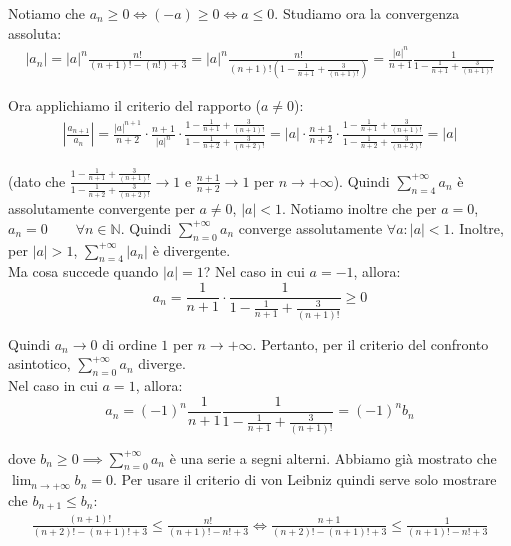\documentclass{article}
\begin{document}
\noindent Notiamo che $a_n \geq 0 \iff (-a) \geq 0 \iff a \leq 0$. Studiamo ora la convergenza assoluta:
\begin{align*}
    |a_n| = |a|^n \frac{n!}{(n + 1)! - (n!) + 3} = |a|^n \frac{n!}{(n + 1)!(1 - \frac{1}{n + 1} + \frac{3}{(n + 1)!})} = \frac{|a|^n}{n + 1} \frac{1}{1 - \frac{1}{n + 1} + \frac{3}{(n + 1)!}}
\end{align*}

\noindent Ora applichiamo il criterio del rapporto ($a \neq 0$):
\begin{align*}
    \left|\frac{a_{n + 1}}{a_n}\right| = \frac{|a|^{n + 1}}{n + 2} \cdot \frac{n + 1}{|a|^n} \cdot \frac{1 - \frac{1}{n + 1} + \frac{3}{(n + 1)!}}{1 - \frac{1}{n + 2} + \frac{3}{(n + 2)!}} = |a| \cdot \frac{n + 1}{n + 2} \cdot\frac{1 - \frac{1}{n + 1} + \frac{3}{(n + 1)!}}{1 - \frac{1}{n + 2} + \frac{3}{(n + 2)!}} = |a|
\end{align*}

\noindent (dato che $\frac{1 - \frac{1}{n + 1} + \frac{3}{(n + 1)!}}{1 - \frac{1}{n + 2} + \frac{3}{(n + 2)!}} \to 1$ e $\frac{n + 1}{n + 2} \to 1$ per $n \to +\infty$). Quindi $\sum_{n = 4}^{+\infty} a_n$ è assolutamente convergente per $a \neq 0$, $|a| < 1$. Notiamo inoltre che per $a = 0$, $a_n = 0 \qquad \forall n \in \mathbb{N}$. Quindi $\sum_{n = 0}^{+\infty} a_n$ converge assolutamente $\forall a : |a| < 1$. Inoltre, per $|a| > 1$, $\sum_{n = 4}^{+\infty} |a_n|$ è divergente.\\
Ma cosa succede quando $|a| = 1$? Nel caso in cui $a = - 1$, allora:
\begin{equation*}
    a_n = \frac{1}{n + 1} \cdot \frac{1}{1 - \frac{1}{n + 1} + \frac{3}{(n + 1)!}} \geq 0
\end{equation*}

\noindent Quindi $a_n \to 0$ di ordine $1$ per $n \to +\infty$. Pertanto, per il criterio del confronto asintotico, $\sum_{n = 0}^{+\infty} a_n$ diverge.\\
Nel caso in cui $a = 1$, allora:
\begin{equation*}
    a_n = (-1)^n \frac{1}{n + 1} \frac{1}{1 - \frac{1}{n + 1} + \frac{3}{(n + 1)!}} = (-1)^n b_n 
\end{equation*}

\noindent dove $b_n \geq 0 \implies \sum_{n = 0}^{+\infty} a_n$ è una serie a segni alterni. Abbiamo già mostrato che $\lim_{n \to +\infty} b_n = 0$. Per usare il criterio di von Leibniz quindi serve solo mostrare che $b_{n + 1} \leq b_n$:
\begin{align*}
    \frac{(n + 1)!}{(n + 2)! - (n + 1)! + 3} \leq \frac{n!}{(n + 1)! - n! + 3} \iff \frac{n + 1}{(n + 2)! - (n + 1)! + 3} \leq \frac{1}{(n + 1)! - n! + 3}
\end{align*}
\end{document}
